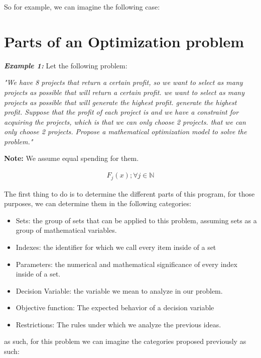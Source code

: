 \documentclass{textbook}
\begin{document}
So for example, we can imagine the following case:

\section{Parts of an Optimization problem}

\textbf{\textit{Example 1:}}
Let the following problem:

\textit{"We have 8 projects that return a certain profit, so we want to select as many projects as possible that will return a certain profit.
we want to select as many projects as possible that will generate the highest profit.
generate the highest profit. Suppose that the profit of each project is
and we have a constraint for acquiring the projects, which is that we can only choose 2 projects.
that we can only choose 2 projects.
Propose a mathematical optimization model to solve the problem."}

\textbf{Note:} We assume equal spending for them.

\begin{gather}
    F_{j}(x); \forall j \in \mathbb{N}
\end{gather}

The first thing to do is to determine the different parts of this program, for those purposes, we can
determine them in the following categories:

\begin{itemize}
    \item Sets: the group of sets that can be applied to this problem, assuming sets as a group of mathematical variables.
    \item Indexes: the identifier for which we call every item inside of a set
    \item Parameters: the numerical and mathematical significance of every index inside of a set.
    \item Decision Variable: the variable we mean to analyze in our problem.
    \item Objective function: The expected behavior of a decision variable
    \item Restrictions: The rules under which we analyze the previous ideas.
\end{itemize}

as such, for this problem we can imagine the categories proposed previously as such:
\end{document}
